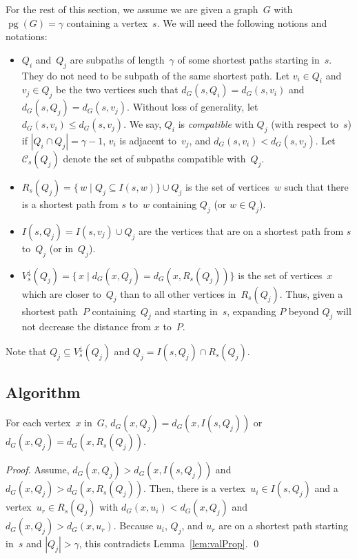 \documentclass[10pt]{llncs}
\newcommand{\calC}{\mathcal{C}}
\DeclareMathOperator{\pg}{pg}
\begin{document}
For the rest of this section, we assume we are given a graph~$G$ with $\pg(G) = \gamma$ containing a vertex~$s$.
We will need the following notions and notations:
\begin{itemize}
\item
$Q_{i}$ and~$Q_j$ are subpaths of length~$\gamma$ of some shortest paths starting in~$s$.
They do not need to be subpath of the same shortest path.
Let $v_i \in Q_i$ and $v_j \in Q_j$ be the two vertices such that $d_G(s, Q_i) = d_G(s, v_i)$ and  $d_G(s, Q_j) = d_G(s, v_j)$.
Without loss of generality, let $d_G(s, v_i) \leq d_G(s, v_j)$.
We say, $Q_{i}$ is \emph{compatible} with $Q_j$ (with respect to~$s$) if $|Q_{i} \cap Q_j| = \gamma - 1$, $v_{i}$ is adjacent to~$v_j$, and $d_G(s, v_i) < d_G(s, v_j)$.
Let $\calC_s(Q_j)$ denote the set of subpaths compatible with~$Q_j$.

\item
$R_s(Q_j) = \{ \, w \mid Q_j \subseteq I(s, w) \} \cup Q_j$ is the set of vertices~$w$ such that there is a shortest path from $s$ to~$w$ containing $Q_j$ (or $w \in Q_j$).

\item
$I(s, Q_j) = I(s, v_j) \cup Q_j$ are the vertices that are on a shortest path from $s$ to~$Q_j$ (or in~$Q_j$).

\item
$V^\downarrow_s(Q_j) = \{ \, x \mid d_G(x, Q_j) = d_G(x, R_s(Q_j)) \}$ is the set of vertices~$x$ which are closer to~$Q_j$ than to all other vertices in~$R_s(Q_j)$.
Thus, given a shortest path~$P$ containing~$Q_j$ and starting in~$s$, expanding $P$ beyond $Q_j$ will not decrease the distance from $x$ to~$P$.
\end{itemize}
Note that $Q_j \subseteq V^\downarrow_s(Q_j)$ and $Q_j = I(s, Q_j) \cap R_s(Q_j)$.

\subsection{Algorithm}

\begin{lemma}
    \label{lem:kValeyVert}
For each vertex~$x$ in~$G$, $d_G(x, Q_j) = d_G(x, I(s, Q_j))$ or $d_G(x, Q_j) = d_G(x, R_s(Q_j))$.
\end{lemma}

\begin{proof}
Assume, $d_G(x, Q_j) > d_G(x, I(s, Q_j))$ and $d_G(x, Q_j) > d_G(x, R_s(Q_j))$.
Then, there is a vertex~$u_i \in I(s,Q_j)$ and a vertex~$u_r \in R_s(Q_j)$ with $d_G(x, u_i) < d_G(x, Q_j)$ and $d_G(x, Q_j) > d_G(x, u_r)$.
Because $u_i$, $Q_j$, and $u_r$ are on a shortest path starting in~$s$ and $|Q_j| > \gamma$, this contradicts Lemma~\ref{lem:valProp}.
\qed
\end{proof}
\end{document}
